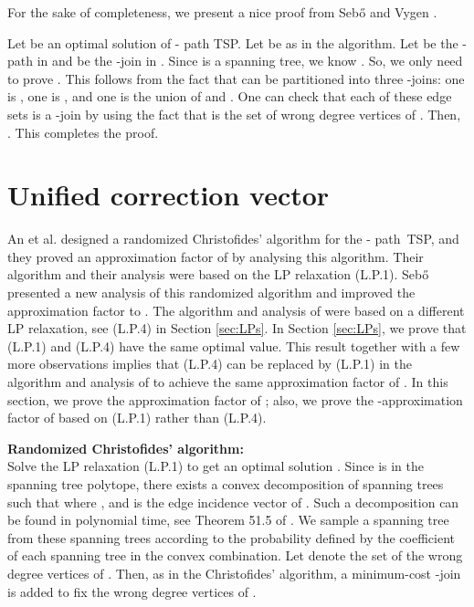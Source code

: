 \documentclass[11pt]{article}
\newcommand{\qed}{\hspace*{\fill}}
\newenvironment{proof}[1][Proof. ]{\noindent {\bf #1 }}{\qed}
\begin{document}
For the sake of completeness, we present a nice proof from Seb\H{o} and Vygen \cite{SV12}.

\vspace{3mm}

\begin{proof}
Let  be an optimal solution of - path TSP. Let  be as in the algorithm. Let  be the - path in 
 and  be the -join in . Since  is a spanning tree,
 we know . So, we only need to prove .
 This follows from the fact that  can be partitioned into three -joins:
 one is , one is ,
 and one is the union of  and . One can check that each of these edge sets is a -join
 by using the fact that  is the set of wrong degree vertices of .
  Then, . This completes the proof.
\end{proof}



\section{Unified correction vector}\label{sec:ucv}

An et al. \cite{AKS12} designed a randomized Christofides' algorithm for the - path~TSP, and
they proved an approximation factor of
 by analysing this algorithm.
Their algorithm and their analysis were based on the LP relaxation (L.P.1).
Seb\H{o} \cite{sebo13} presented a new analysis of this randomized algorithm
and improved the approximation factor to .
The algorithm and analysis of \cite{sebo13} were based on
a different LP relaxation, see (L.P.4) in Section \ref{sec:LPs}.
In Section \ref{sec:LPs}, we prove that
(L.P.1) and (L.P.4) have the same optimal value.
This result together with a few more observations implies that
(L.P.4) can be replaced by (L.P.1) in
the algorithm and analysis of \cite{sebo13}
to achieve the same approximation factor of .
In this section,
we prove the approximation factor of \cite{AKS12}; also,
we prove the -approximation factor of \cite{sebo13}
based on (L.P.1) rather than (L.P.4).





\bigskip

\noindent \textbf{Randomized Christofides' algorithm:} \\
Solve the LP relaxation (L.P.1) to get an optimal solution . Since  is in the spanning tree polytope,
there exists a convex decomposition of spanning trees
 such that
 where ,  and 
is the edge incidence vector of .
Such a decomposition can be found in polynomial time, see
Theorem 51.5 of \cite{Sch03}. We sample a spanning tree  from these spanning trees according to
the probability defined by the coefficient  of
each spanning tree in the convex combination.
Let  denote the set of the wrong degree vertices of .
Then, as in the Christofides' algorithm,
a minimum-cost -join  is added to fix
the wrong degree vertices of .
\end{document}
